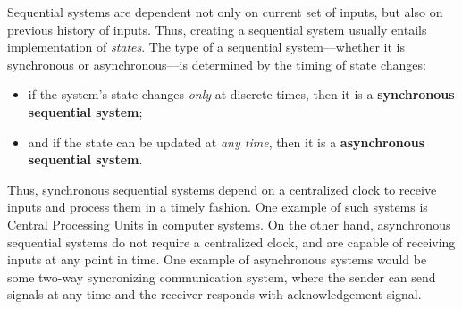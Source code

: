 \documentclass{homework}
\begin{document}
\maketitle


Sequential systems are dependent not only on current set of inputs, but also on previous history of inputs. Thus, creating a sequential system usually entails implementation of \textit{states}. The type of a sequential system---whether it is synchronous or asynchronous---is determined by the timing of state changes:
\begin{itemize}
\item if the system's state changes \textit{only} at discrete times, then it is a \textbf{synchronous sequential system};
\item and if the state can be updated at \textit{any time}, then it is a \textbf{asynchronous sequential system}.
\end{itemize}

Thus, synchronous sequential systems depend on a centralized clock to receive inputs and process them in a timely fashion. One example of such systems is Central Processing Units in computer systems. On the other hand, asynchronous sequential systems do not require a centralized clock, and are capable of receiving inputs at any point in time. One example of asynchronous systems would be some two-way syncronizing communication system, where the sender can send signals at any time and the receiver responds with acknowledgement signal.

\question
\end{document}

